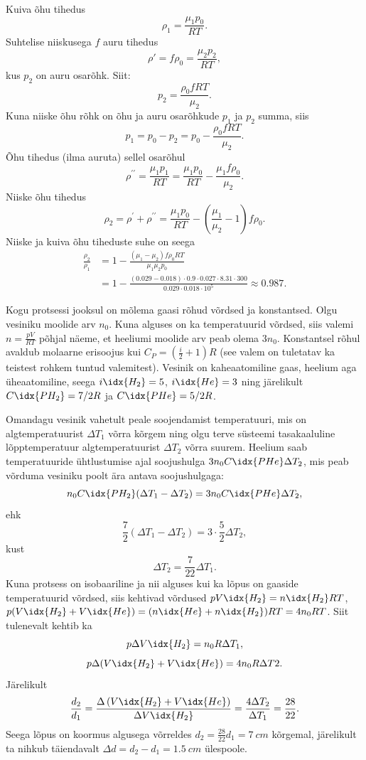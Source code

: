 \documentclass[10pt]{article}
\begin{document}
{
\solu
Kuiva õhu tihedus
\[
\rho_1 = \frac{\mu_1p_0}{RT}.
\]
Suhtelise niiskusega $f$ auru tihedus
\[
\rho' = f \rho_0 = \frac{\mu_2p_2}{RT},
\]
kus $p_2$ on auru osarõhk. Siit:
\[
p_2 = \frac{\rho_0fRT}{\mu_2}.
\]
Kuna niiske õhu rõhk on õhu ja auru osarõhkude $p_1$ ja $p_2$ summa, siis
\[
p_1 = p_0 - p_2 = p_0 - \frac{\rho_0fRT}{\mu_2}.
\]
Õhu tihedus (ilma auruta) sellel osarõhul
\[
\rho^{\prime \prime}=\frac{\mu_{1} p_{1}}{R T}=\frac{\mu_{1} p_{0}}{R T}-\frac{\mu_{1} f \rho_{0}}{\mu_{2}}.
\]
Niiske õhu tihedus
\[
\rho_{2}=\rho^{\prime}+\rho^{\prime \prime}=\frac{\mu_{1} p_{0}}{R T}-\left(\frac{\mu_{1}}{\mu_{2}}-1\right) f \rho_{0}.
\]
Niiske ja kuiva õhu tiheduste suhe on seega
\[
\begin{aligned}
\frac{\rho_{2}}{\rho_{1}}&=1-\frac{\left(\mu_{1}-\mu_{2}\right) f \rho_{0} R T}{\mu_{1} \mu_{2} p_{0}} \\ 
&=1-\frac{(\num{0,029}-\num{0,018}) \cdot \num{0,9} \cdot \num{0,027} \cdot \num{8,31} \cdot 300}{\num{0,029} \cdot \num{0,018} \cdot 10^{5}} \approx \num{0,987}.
\end{aligned}
\]
\probend
\bigskip


\solu
Kogu protsessi jooksul on mõlema gaasi rõhud võrdsed ja konstantsed. Olgu vesiniku moolide arv $n_0$. Kuna alguses on ka temperatuurid võrdsed, siis valemi $n = \frac{pV}{RT}$ põhjal näeme, et heeliumi moolide arv peab olema $3n_0$. Konstantsel rõhul avaldub molaarne erisoojus kui $C_P = \left(\frac{i}{2} + 1\right) R$ (see valem on tuletatav ka teistest rohkem tuntud valemitest). Vesinik on kaheaatomiline gaas, heelium aga üheaatomiline, seega $i\idx{H_2} = 5$, $i\idx{He} = 3$ ning järelikult $C\idx{PH_2} = 7/2R$ ja $C\idx{PHe} = 5/2R$.

Omandagu vesinik vahetult peale soojendamist temperatuuri, mis on algtemperatuurist $\Delta T_1$ võrra kõrgem ning olgu terve süsteemi tasakaaluline lõpptemperatuur algtemperatuurist $\Delta T_2$ võrra suurem. Heelium saab temperatuuride ühtlustumise ajal soojushulga $3n_0C\idx{PHe}\Delta T_2$, mis peab võrduma vesiniku poolt ära antava soojushulgaga:
\[
n_0C\idx{PH_2} (\Delta T_1 - \Delta T_2) = 3n_0C\idx{PHe}\Delta T_2,
\]
ehk
\[
\frac{7}{2} (\Delta T_1 - \Delta T_2) = 3 \cdot \frac{5}{2} \Delta T_2,
\]
kust
\[
\Delta T_2 = \frac{7}{22} \Delta T_1.
\]
Kuna protsess on isobaariline ja nii alguses kui ka lõpus on gaaside temperatuurid võrdsed, siis kehtivad võrdused $pV\idx{H_2} = n\idx{H_2}RT$, $p(V\idx{H_2} + V\idx{He}) = (n\idx{He} + n\idx{H_2} )RT = 4n_0RT$. Siit tulenevalt kehtib ka
\[
p\Delta V\idx{H_2} = n_0R\Delta T_1,
\]
\[
p\Delta (V\idx{H_2} + V\idx{He}) = 4n_0R\Delta T2.
\]
Järelikult
\[
\frac{d_{2}}{d_{1}}=\frac{\Delta\left(V\idx{H_{2}}+V\idx{H e}\right)}{\Delta V\idx{H_{2}}}=\frac{4 \Delta T_{2}}{\Delta T_{1}}=\frac{28}{22}.
\]
Seega lõpus on koormus algusega võrreldes $d_2 = \frac{28}{22} d_1 = \SI{7}{cm}$ kõrgemal, järelikult ta nihkub täiendavalt $\Delta d = d_2 - d_1 = \SI{1,5}{cm}$ ülespoole.
\probend
\bigskip

}
\end{document}
